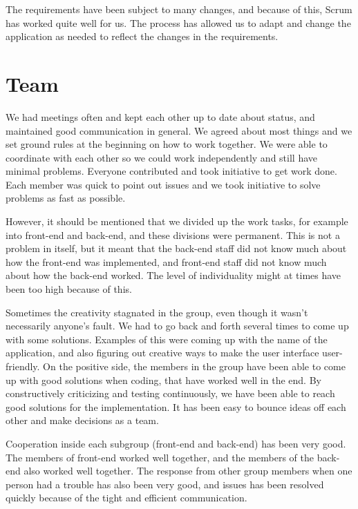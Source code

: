 The requirements have been subject to many changes, and because of this, Scrum has worked quite well for us. The process has allowed us to adapt and change the application as needed to reflect the changes in the requirements.

\section{Team}

We had meetings often and kept each other up to date about status, and maintained good communication in general. We agreed about most things and we set ground rules at the beginning on how to work together. We were able to coordinate with each other so we could work independently and still have minimal problems. Everyone contributed and took initiative to get work done. Each member was quick to point out issues and we took initiative to solve problems as fast as possible.\newline

However, it should be mentioned that we divided up the work tasks, for example into front-end and back-end, and these divisions were permanent. This is not a problem in itself, but it meant that the back-end staff did not know much about how the front-end was implemented, and front-end staff did not know much about how the back-end worked. The level of individuality might at times have been too high because of this.\newline

Sometimes the creativity stagnated in the group, even though it wasn't necessarily anyone's fault. We had to go back and forth several times to come up with some solutions. Examples of this were coming up with the name of the application, and also figuring out creative ways to make the user interface user-friendly. On the positive side, the members in the group have been able to come up with good solutions when coding, that have worked well in the end. By constructively criticizing and testing continuously, we have been able to reach good solutions for the implementation. It has been easy to bounce ideas off each other and make decisions as a team.\newline

Cooperation inside each subgroup (front-end and back-end) has been very good. The members of front-end worked well together, and the members of the back-end also worked well together. The response from other group members when one person had a trouble has also been very good, and issues has been resolved quickly because of the tight and efficient communication.\newline

